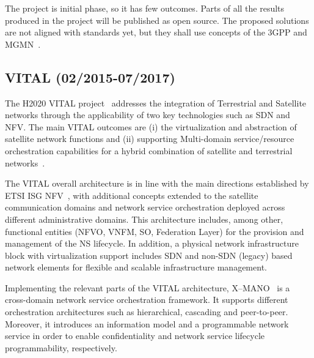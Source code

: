 The project is initial phase, so it has few outcomes. Parts of all the results produced in the project will be published as open source. The proposed solutions are not aligned with standards yet, but they shall use concepts of the 3GPP and MGMN~\cite{H20205G-TRANSFORMERProject2017InitialRoadmap}.

\subsection{VITAL (02/2015-07/2017)}

The H2020 VITAL project~\cite{vital} addresses the integration of Terrestrial and Satellite networks through the applicability of two key technologies such as SDN and NFV. The main VITAL outcomes are (i) the virtualization and abstraction of satellite network functions and (ii) supporting Multi-domain service/resource orchestration capabilities for a hybrid combination of satellite and terrestrial networks~\cite{vitalD23}. 

The VITAL overall architecture is in line with the main directions established by ETSI ISG NFV~\cite{ETSIIndustrySpecificationGroupISGNFV2013NetworkFramework}, with additional concepts extended to the satellite communication domains and network service orchestration deployed across different administrative domains. This architecture includes, among other, functional entities (NFVO, VNFM, SO, Federation Layer) for the provision and management of the NS lifecycle. In addition, a physical network infrastructure block with virtualization support includes SDN and non-SDN (legacy) based network elements for flexible and scalable infrastructure management.

Implementing the relevant parts of the VITAL architecture, X--MANO~\cite{francescon2017x} is a cross-domain network service orchestration framework. It supports different orchestration architectures such as hierarchical, cascading  and peer-to-peer. Moreover, it introduces an information model and a programmable network service in order to enable confidentiality and network service lifecycle programmability, respectively.

